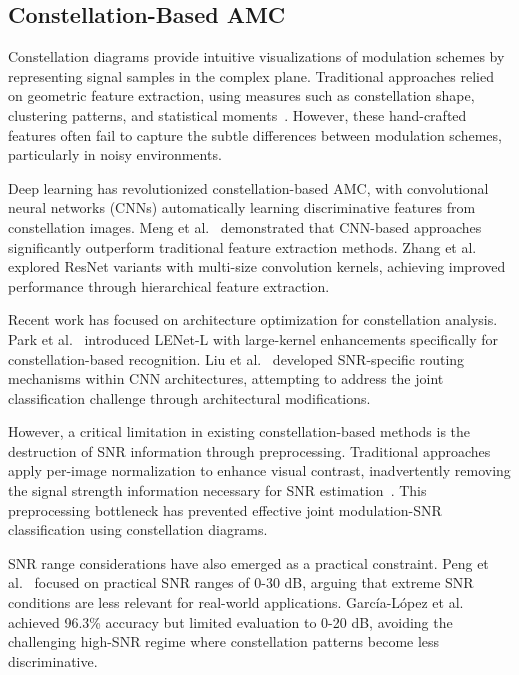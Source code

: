 \documentclass{ELSP}
\begin{document}
\subsection{Constellation-Based AMC}

Constellation diagrams provide intuitive visualizations of modulation schemes by representing signal samples in the complex plane. Traditional approaches relied on geometric feature extraction, using measures such as constellation shape, clustering patterns, and statistical moments~\cite{swami2000hierarchical,azzouz1996automatic}. However, these hand-crafted features often fail to capture the subtle differences between modulation schemes, particularly in noisy environments.

Deep learning has revolutionized constellation-based AMC, with convolutional neural networks (CNNs) automatically learning discriminative features from constellation images. Meng et al.~\cite{meng2018automatic} demonstrated that CNN-based approaches significantly outperform traditional feature extraction methods. Zhang et al.~\cite{zhang2022resnet} explored ResNet variants with multi-size convolution kernels, achieving improved performance through hierarchical feature extraction.

Recent work has focused on architecture optimization for constellation analysis. Park et al.~\cite{park2023lenet} introduced LENet-L with large-kernel enhancements specifically for constellation-based recognition. Liu et al.~\cite{liu2023robust} developed SNR-specific routing mechanisms within CNN architectures, attempting to address the joint classification challenge through architectural modifications.

However, a critical limitation in existing constellation-based methods is the destruction of SNR information through preprocessing. Traditional approaches apply per-image normalization to enhance visual contrast, inadvertently removing the signal strength information necessary for SNR estimation~\cite{tu2019deep,han2020modulation}. This preprocessing bottleneck has prevented effective joint modulation-SNR classification using constellation diagrams.

SNR range considerations have also emerged as a practical constraint. Peng et al.~\cite{peng2023constellation} focused on practical SNR ranges of 0-30 dB, arguing that extreme SNR conditions are less relevant for real-world applications. García-López et al.~\cite{garcia2024ultralight} achieved 96.3\% accuracy but limited evaluation to 0-20 dB, avoiding the challenging high-SNR regime where constellation patterns become less discriminative.
\end{document}
